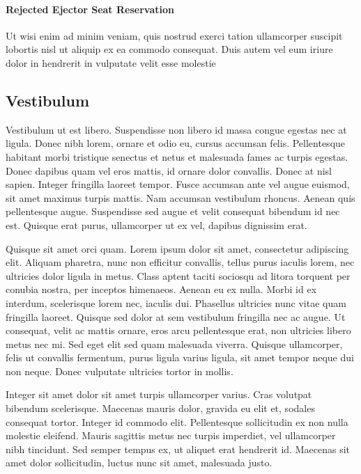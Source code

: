 \documentclass[journal]{vgtc}                %
\begin{document}
\paragraph{Rejected Ejector Seat Reservation}

Ut wisi enim ad minim veniam, quis nostrud exerci tation ullamcorper
suscipit lobortis nisl ut aliquip ex ea commodo consequat. Duis autem
vel eum iriure dolor in hendrerit in vulputate velit esse molestie

\subsection{Vestibulum}

Vestibulum ut est libero. Suspendisse non libero id massa congue egestas nec at ligula. Donec nibh lorem, ornare et odio eu, cursus accumsan felis. Pellentesque habitant morbi tristique senectus et netus et malesuada fames ac turpis egestas. Donec dapibus quam vel eros mattis, id ornare dolor convallis. Donec at nisl sapien. Integer fringilla laoreet tempor. Fusce accumsan ante vel augue euismod, sit amet maximus turpis mattis. Nam accumsan vestibulum rhoncus. Aenean quis pellentesque augue. Suspendisse sed augue et velit consequat bibendum id nec est. Quisque erat purus, ullamcorper ut ex vel, dapibus dignissim erat.

Quisque sit amet orci quam. Lorem ipsum dolor sit amet, consectetur adipiscing elit. Aliquam pharetra, nunc non efficitur convallis, tellus purus iaculis lorem, nec ultricies dolor ligula in metus. Class aptent taciti sociosqu ad litora torquent per conubia nostra, per inceptos himenaeos. Aenean eu ex nulla. Morbi id ex interdum, scelerisque lorem nec, iaculis dui. Phasellus ultricies nunc vitae quam fringilla laoreet. Quisque sed dolor at sem vestibulum fringilla nec ac augue. Ut consequat, velit ac mattis ornare, eros arcu pellentesque erat, non ultricies libero metus nec mi. Sed eget elit sed quam malesuada viverra. Quisque ullamcorper, felis ut convallis fermentum, purus ligula varius ligula, sit amet tempor neque dui non neque. Donec vulputate ultricies tortor in mollis.

Integer sit amet dolor sit amet turpis ullamcorper varius. Cras volutpat bibendum scelerisque. Maecenas mauris dolor, gravida eu elit et, sodales consequat tortor. Integer id commodo elit. Pellentesque sollicitudin ex non nulla molestie eleifend. Mauris sagittis metus nec turpis imperdiet, vel ullamcorper nibh tincidunt. Sed semper tempus ex, ut aliquet erat hendrerit id. Maecenas sit amet dolor sollicitudin, luctus nunc sit amet, malesuada justo.
\end{document}

